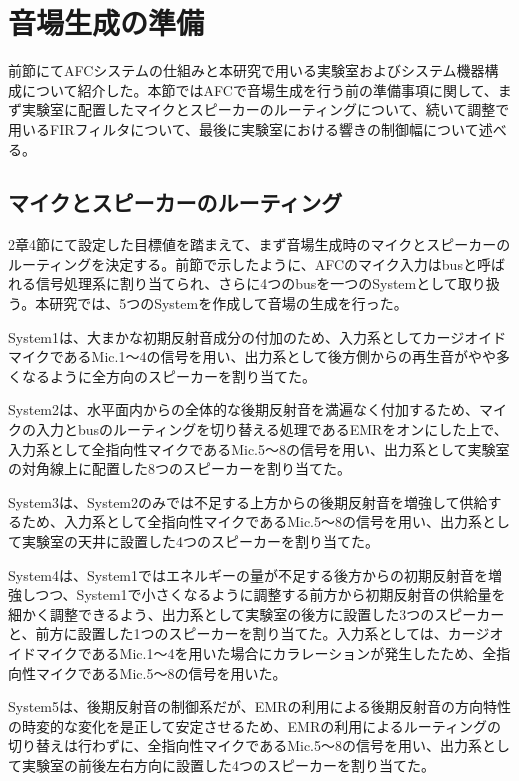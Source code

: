 \documentclass[11pt,a4j]{jreport}
\begin{document}
\section{音場生成の準備}
前節にてAFCシステムの仕組みと本研究で用いる実験室およびシステム機器構成について紹介した。本節ではAFCで音場生成を行う前の準備事項に関して、まず実験室に配置したマイクとスピーカーのルーティングについて、続いて調整で用いるFIRフィルタについて、最後に実験室における響きの制御幅について述べる。

\subsection{マイクとスピーカーのルーティング}
2章4節にて設定した目標値を踏まえて、まず音場生成時のマイクとスピーカーのルーティングを決定する。前節で示したように、AFCのマイク入力はbusと呼ばれる信号処理系に割り当てられ、さらに4つのbusを一つのSystemとして取り扱う。本研究では、5つのSystemを作成して音場の生成を行った。

System1は、大まかな初期反射音成分の付加のため、入力系としてカージオイドマイクであるMic.1〜4の信号を用い、出力系として後方側からの再生音がやや多くなるように全方向のスピーカーを割り当てた。

System2は、水平面内からの全体的な後期反射音を満遍なく付加するため、マイクの入力とbusのルーティングを切り替える処理であるEMRをオンにした上で、入力系として全指向性マイクであるMic.5〜8の信号を用い、出力系として実験室の対角線上に配置した8つのスピーカーを割り当てた。

System3は、System2のみでは不足する上方からの後期反射音を増強して供給するため、入力系として全指向性マイクであるMic.5〜8の信号を用い、出力系として実験室の天井に設置した4つのスピーカーを割り当てた。

System4は、System1ではエネルギーの量が不足する後方からの初期反射音を増強しつつ、System1で小さくなるように調整する前方から初期反射音の供給量を細かく調整できるよう、出力系として実験室の後方に設置した3つのスピーカーと、前方に設置した1つのスピーカーを割り当てた。入力系としては、カージオイドマイクであるMic.1〜4を用いた場合にカラレーションが発生したため、全指向性マイクであるMic.5〜8の信号を用いた。

System5は、後期反射音の制御系だが、EMRの利用による後期反射音の方向特性の時変的な変化を是正して安定させるため、EMRの利用によるルーティングの切り替えは行わずに、全指向性マイクであるMic.5〜8の信号を用い、出力系として実験室の前後左右方向に設置した4つのスピーカーを割り当てた。
\end{document}
